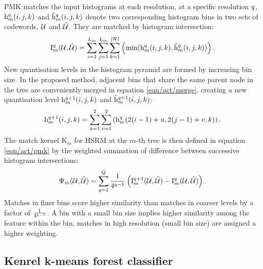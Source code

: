 PMK matches the input histograms at each resolution, at a specific resolution $q$, $\mathrm{h}^q_{m}(i,j,k)$ and $\mathrm{\hat{h}}^q_{m}(i,j,k)$ denote two corresponding histogram bins in two sets of codewords, $\mathcal{U}$ and $\mathcal{\hat{U}}$. They are matched by histogram intersection:
\begin{equation}
	\label{eqn/act/hik}
	\mathrm{I}_{m}^q(\mathcal{U},\mathcal{\hat{U}}) =  \displaystyle\sum_{i=1}^{L_m}\sum_{j=1}^{L_m}\sum_{k=1}^{|\mathcal{R}|} \left( \min(\mathrm{h}^{q}_m(i,j,k), \mathrm{\hat{h}}^{q}_m(i,j,k)) \right).
\end{equation}
New quantisation levels in the histogram pyramid are formed by increasing bin size. In the proposed method, adjacent bins that share the same parent node in the tree are conveniently merged in equation \ref{eqn/act/merge}, creating a new quantisation level $\mathrm{h}^{q+1}_m(i,j,k)$ and $\mathrm{\hat{h}}^{q+1}_m(i,j,k)$:
\begin{equation}
	\label{eqn/act/merge}
	\mathrm{h}^{q+1}_m(i,j,k) = \displaystyle\sum_{u=1}^{2}\sum_{v=1}^{2} \left( \mathrm{h}^{q}_m(2(i-1)+u,2(j-1)+v,k) \right).
\end{equation}
The match kernel $\mathrm{K}_m$ for HSRM at the $m$-th tree is then defined in equation \ref{eqn/act/pmk} by the weighted summation of difference between successive histogram intersections:
\begin{equation}
	\label{eqn/act/pmk}
	\Psi_m(\mathcal{U},\mathcal{\hat{U}}) = \displaystyle\sum_{q = 1}^{Q}\frac{1}{4^{q-1}} \left( \mathrm{I}_{m}^{q+1}(\mathcal{U},\mathcal{\hat{U}}) - \mathrm{I}_{m}^{q}(\mathcal{U},\mathcal{\hat{U}}) \right).
\end{equation}
Matches in finer bins score higher similarity than matches in coarser levels by a factor of $\frac{1}{4^{q-1}}$. A bin with a small bin size implies higher similarity among the feature within the bin, matches in high resolution (small bin size) are assigned a higher weighting.  

\subsection{Kenrel k-means forest classifier}

